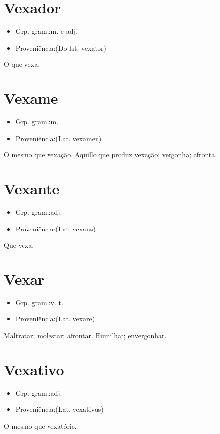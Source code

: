 \documentclass{article}
\begin{document}
\section{Vexador}
\begin{itemize}
\item {Grp. gram.:m.  e  adj.}
\end{itemize}
\begin{itemize}
\item {Proveniência:(Do lat. \textunderscore vexator\textunderscore )}
\end{itemize}
O que vexa.
\section{Vexame}
\begin{itemize}
\item {Grp. gram.:m.}
\end{itemize}
\begin{itemize}
\item {Proveniência:(Lat. \textunderscore vexamen\textunderscore )}
\end{itemize}
O mesmo que \textunderscore vexação\textunderscore .
Aquillo que produz vexação; vergonha; afronta.
\section{Vexante}
\begin{itemize}
\item {Grp. gram.:adj.}
\end{itemize}
\begin{itemize}
\item {Proveniência:(Lat. \textunderscore vexans\textunderscore )}
\end{itemize}
Que vexa.
\section{Vexar}
\begin{itemize}
\item {Grp. gram.:v. t.}
\end{itemize}
\begin{itemize}
\item {Proveniência:(Lat. \textunderscore vexare\textunderscore )}
\end{itemize}
Maltratar; molestar; afrontar.
Humilhar; envergonhar.
\section{Vexativo}
\begin{itemize}
\item {Grp. gram.:adj.}
\end{itemize}
\begin{itemize}
\item {Proveniência:(Lat. \textunderscore vexativus\textunderscore )}
\end{itemize}
O mesmo que \textunderscore vexatório\textunderscore .
\end{document}
